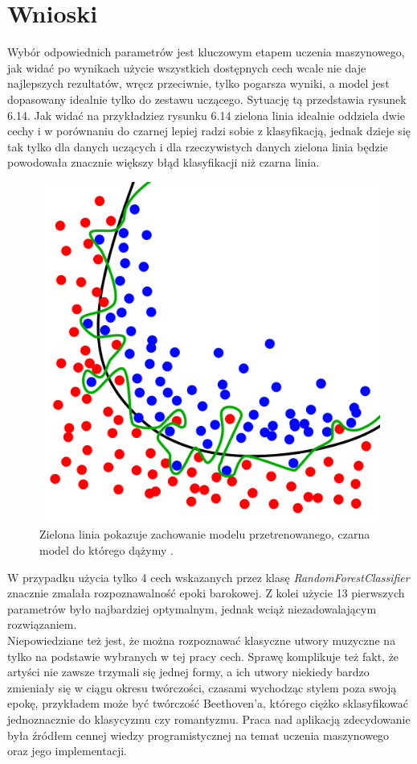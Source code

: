 \documentclass[printmode, eng, openany]{mgr}
\newcommand\tab[1][1cm]{\hspace*{#1}}
\begin{document}
\section{Wnioski}
\tab Wybór odpowiednich parametrów jest kluczowym etapem uczenia maszynowego, jak widać po wynikach użycie wszystkich dostępnych cech wcale nie daje najlepszych rezultatów, wręcz przeciwnie, tylko pogarsza wyniki, a model jest dopasowany idealnie tylko do zestawu uczącego. Sytuację tą przedstawia rysunek 6.14. Jak widać na przykładzie\linebreak z rysunku 6.14 zielona linia idealnie oddziela dwie cechy i w porównaniu do czarnej lepiej radzi sobie z klasyfikacją, jednak dzieje się tak tylko dla danych uczących i dla rzeczywistych danych zielona linia będzie powodowała znacznie większy błąd klasyfikacji niż czarna linia.
\begin{figure}[H]
\centering
\includegraphics[scale=0.3]{overfitting.png}
\caption{Zielona linia pokazuje zachowanie modelu przetrenowanego, czarna model do którego dążymy \cite{ovrimg}. }
\end{figure}
\tab W przypadku użycia tylko 4 cech wskazanych przez klasę \textit{RandomForestClassifier} znacznie zmalała rozpoznawalność epoki barokowej. Z kolei użycie 13 pierwszych parametrów było najbardziej optymalnym, jednak wciąż niezadowalającym rozwiązaniem.\\
\tab Niepowiedziane też jest, że można rozpoznawać klasyczne utwory muzyczne na tylko na podstawie wybranych w tej pracy cech. Sprawę komplikuje też fakt, że artyści nie zawsze trzymali się jednej formy, a ich utwory niekiedy bardzo zmieniały się w ciągu okresu twórczości, czasami wychodząc stylem poza swoją epokę, przykładem może być twórczość Beethoven'a, którego ciężko sklasyfikować jednoznacznie do klasycyzmu czy romantyzmu.
\tab Praca nad aplikacją zdecydowanie była źródłem cennej wiedzy programistycznej na temat uczenia maszynowego oraz jego implementacji.
\end{document}
